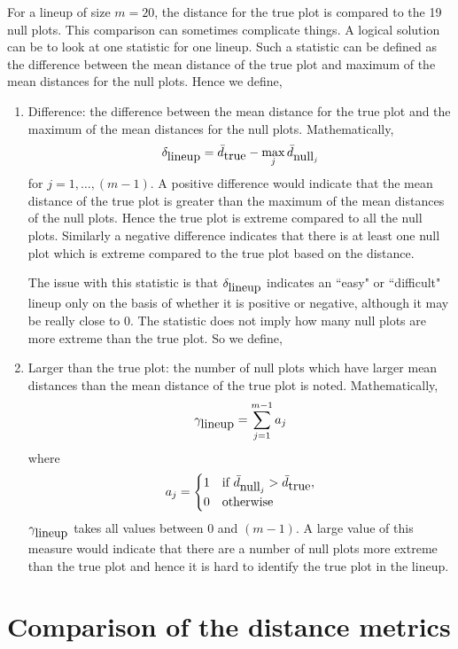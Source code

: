 \documentclass[12]{article}
\begin{document}
For a lineup of size $m = 20$, the distance for the true plot is compared to the 19 null plots. This comparison can sometimes complicate things. A logical solution can be to look at one statistic for one lineup. Such a statistic can be defined as the difference between the mean distance of the true plot and maximum of the mean distances for the null plots. Hence we define, 
\begin{enumerate}
\item Difference: the difference between the mean distance for the true plot and the maximum of the mean distances for the null plots. Mathematically,
$$\delta_{\hbox{lineup}} = \bar{d}_{\hbox{true}} - \max_j \bar{d}_{\hbox{null}_j}$$
for $j = 1, \dots, (m  - 1).$
 A positive difference would indicate that the mean distance of the true plot is greater than the maximum of the mean distances of the null plots. Hence the true plot is extreme compared to all the null plots. Similarly a negative difference indicates that there is at least one null plot which is extreme compared to the true plot based on the distance.
 
The issue with this statistic is that $\delta_{\hbox{lineup}}$ indicates an ``easy" or ``difficult" lineup only on the basis of whether it is positive or negative, although it may be really close to 0. The statistic does not imply how many null plots are more extreme than the true plot. So we define,
\item Larger than the true plot: the number of null plots which have larger mean distances than the mean distance of the true plot is noted. Mathematically,
 $$\gamma_{\hbox{lineup}} = \sum_{j = 1}^{m - 1} a_j$$ where 
\begin{equation}
a_j =
\begin{cases}
1 & \text{if } \bar{d}_{\hbox{null}_j} > \bar{d}_{\hbox{true}} ,
\\
0 & \text{otherwise}
\end{cases}
\end{equation}
$\gamma_{\hbox{lineup}}$ takes all values between 0 and $(m - 1)$. A large value of this measure would indicate that there are a number of null plots more extreme than the true plot and hence it is hard to identify the true plot in the lineup.
\end{enumerate}

\section{Comparison of the distance metrics}
\end{document}
